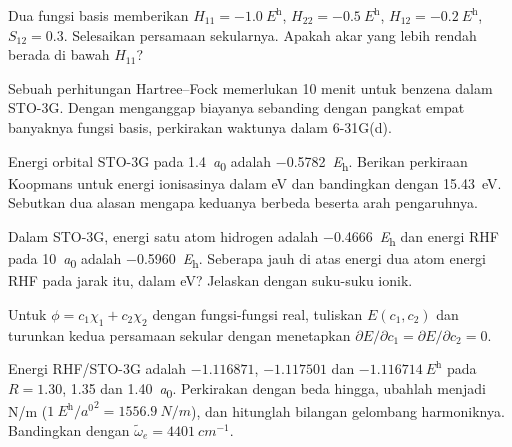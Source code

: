\begin{exercise}[$\star\star$]\label{exo:b3:computational-chemistry:6}
Dua fungsi basis memberikan $H_{11} = \qty{-1.0}{\hartree}$, $H_{22} =
\qty{-0.5}{\hartree}$, $H_{12} = \qty{-0.2}{\hartree}$, $S_{12} = 0.3$.
Selesaikan persamaan sekularnya. Apakah akar yang lebih rendah berada di
bawah $H_{11}$?
\end{exercise}

\begin{exercise}[$\star\star$]\label{exo:b3:computational-chemistry:7}
Sebuah perhitungan Hartree--Fock memerlukan 10 menit untuk benzena dalam
STO-3G. Dengan menganggap biayanya sebanding dengan pangkat empat banyaknya
fungsi basis, perkirakan waktunya dalam 6-31G(d).
\end{exercise}

\begin{exercise}[$\star\star$]\label{exo:b3:computational-chemistry:8}
Energi orbital STO-3G  pada \qty{1.4}{\bohr} adalah
\qty{-0.5782}{\hartree}. Berikan perkiraan Koopmans untuk energi ionisasinya
dalam eV dan bandingkan dengan \qty{15.43}{eV}. Sebutkan dua alasan mengapa
keduanya berbeda beserta arah pengaruhnya.
\end{exercise}

\begin{exercise}[$\star\star$]\label{exo:b3:computational-chemistry:9}
Dalam STO-3G, energi satu atom hidrogen adalah \qty{-0.4666}{\hartree} dan
energi RHF  pada \qty{10}{\bohr} adalah \qty{-0.5960}{\hartree}.
Seberapa jauh di atas energi dua atom energi RHF pada jarak itu, dalam eV?
Jelaskan dengan suku-suku ionik.
\end{exercise}

\begin{exercise}[$\star\star\star$]\label{exo:b3:computational-chemistry:10}
Untuk $\phi = c_1\chi_1 + c_2\chi_2$ dengan fungsi-fungsi real, tuliskan
$E(c_1,c_2)$ dan turunkan kedua persamaan sekular dengan menetapkan
$\partial E/\partial c_1 =
\partial E/\partial c_2 = 0$.
\end{exercise}

\begin{exercise}[$\star\star\star$]\label{exo:b3:computational-chemistry:11}
Energi RHF/STO-3G  adalah $-1.116871$, $-1.117501$ dan
$\qty{-1.116714}{\hartree}$ pada $R = 1.30$, 1.35 dan \qty{1.40}{\bohr}.
Perkirakan  dengan beda hingga, ubahlah menjadi \unit{N/m}
($\qty{1}{\hartree\per\bohr\squared} = \qty{1556.9}{N/m}$), dan hitunglah
bilangan gelombang harmoniknya. Bandingkan dengan
$\tilde\omega_e = \qty{4401}{cm^{-1}}$.
\end{exercise}


